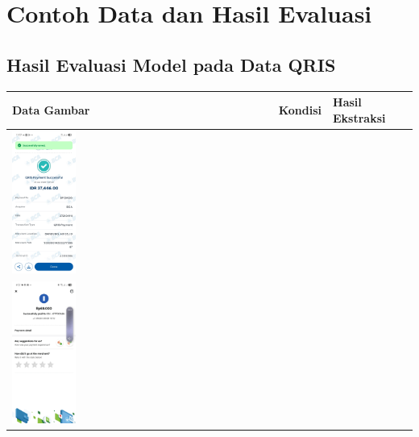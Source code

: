 \chapter{Contoh Data dan Hasil Evaluasi}
\label{chapter:contoh-data}

\section{Hasil Evaluasi Model pada Data QRIS}

\begin{table}[htbp]
    \centering
    \begin{tabularx}{\textwidth}{|p{4.2cm}|X|X|}
        \hline
        \textbf{Data Gambar} & \textbf{Kondisi} & \textbf{Hasil Ekstraksi} \\ \hline
        \includegraphics[width=0.25\textwidth]{images/contoh-data/qris-1.jpg} & 
         & 
         \\ \hline
        \includegraphics[width=0.25\textwidth]{images/contoh-data/qris-2.jpg} & 
         & 
         \\ \hline
    \end{tabularx}
\end{table}

